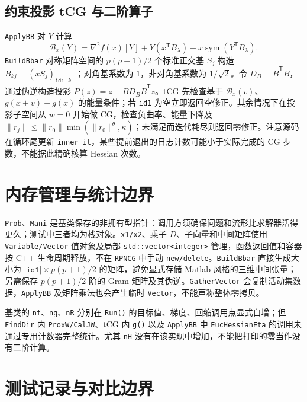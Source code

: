 \documentclass[a4paper,10pt]{article}
\newcommand{\code}[1]{\texttt{#1}}
\begin{document}
\subsection{约束投影 tCG 与二阶算子}
\code{ApplyBB} 对 $Y$ 计算
\begin{equation}
 \mathcal B_x(Y)=\nabla^2 f(x)[Y]+Y(x^{\mathsf T}B_\lambda)
 +x\operatorname{sym}(Y^{\mathsf T}B_\lambda).
\end{equation}
\code{BuildBbar} 对称矩阵空间的 $p(p+1)/2$ 个标准正交基 $S_j$ 构造
$\bar B_{kj}=(xS_j)_{\code{id1}[k]}$；对角基系数为 $1$，非对角基系数为 $1/\sqrt 2$。令 $D_B=\bar B^{\mathsf T}\bar B$，通过伪逆构造投影 $P(z)=z-\bar B D_B^\dagger\bar B^{\mathsf T}z$。tCG 先检查基于 $\mathcal B_x(v)$、$g(x+v)-g(x)$ 的能量条件；若 \code{id1} 为空立即返回空修正。其余情况下在投影子空间从 $w=0$ 开始做 CG，检查负曲率、能量下降及 $\|r_j\|\leq\|r_0\|\min(\|r_0\|^\theta,\kappa)$；未满足而迭代耗尽则返回零修正。注意源码在循环尾更新 \code{inner\_it}，某些提前退出的日志计数可能小于实际完成的 CG 步数，不能据此精确核算 Hessian 次数。

\section{内存管理与统计边界}
\code{Prob}、\code{Mani} 是基类保存的非拥有型指针：调用方须确保问题和流形比求解器活得更久；测试中三者均为栈对象。\code{x1/x2}、乘子 $D$、子向量和中间矩阵使用 \code{Variable/Vector} 值对象及局部 \code{std::vector<integer>} 管理，函数返回值和容器按 C++ 生命周期释放，不在 \code{RPNCG} 中手动 \code{new/delete}。\code{BuildBbar} 直接生成大小为 $|\code{id1}|\times p(p+1)/2$ 的矩阵，避免显式存储 Matlab 风格的三维中间张量；另需保存 $p(p+1)/2$ 阶的 Gram 矩阵及其伪逆。\code{GatherVector} 会复制活动集数据，\code{ApplyBB} 及矩阵乘法也会产生临时 \code{Vector}，不能声称整体零拷贝。

基类的 \code{nf}、\code{ng}、\code{nR} 分别在 \code{Run()} 的目标值、梯度、回缩调用点显式自增；但 \code{FindDir} 内 \code{ProxW/CalJW}、tCG 内 \code{g()} 以及 \code{ApplyBB} 中 \code{EucHessianEta} 的调用未通过专用计数器完整统计。尤其 \code{nH} 没有在该实现中增加，不能把打印的零当作没有二阶计算。

\section{测试记录与对比边界}
\end{document}
